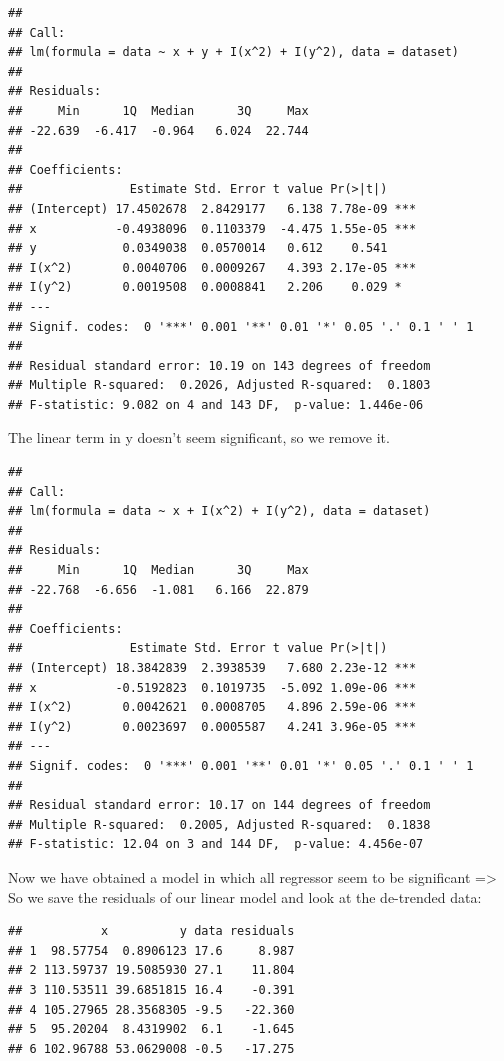 \documentclass[
]{article}
\begin{document}
\begin{verbatim}
## 
## Call:
## lm(formula = data ~ x + y + I(x^2) + I(y^2), data = dataset)
## 
## Residuals:
##     Min      1Q  Median      3Q     Max 
## -22.639  -6.417  -0.964   6.024  22.744 
## 
## Coefficients:
##               Estimate Std. Error t value Pr(>|t|)    
## (Intercept) 17.4502678  2.8429177   6.138 7.78e-09 ***
## x           -0.4938096  0.1103379  -4.475 1.55e-05 ***
## y            0.0349038  0.0570014   0.612    0.541    
## I(x^2)       0.0040706  0.0009267   4.393 2.17e-05 ***
## I(y^2)       0.0019508  0.0008841   2.206    0.029 *  
## ---
## Signif. codes:  0 '***' 0.001 '**' 0.01 '*' 0.05 '.' 0.1 ' ' 1
## 
## Residual standard error: 10.19 on 143 degrees of freedom
## Multiple R-squared:  0.2026, Adjusted R-squared:  0.1803 
## F-statistic: 9.082 on 4 and 143 DF,  p-value: 1.446e-06
\end{verbatim}

The linear term in y doesn't seem significant, so we remove it.

\begin{verbatim}
## 
## Call:
## lm(formula = data ~ x + I(x^2) + I(y^2), data = dataset)
## 
## Residuals:
##     Min      1Q  Median      3Q     Max 
## -22.768  -6.656  -1.081   6.166  22.879 
## 
## Coefficients:
##               Estimate Std. Error t value Pr(>|t|)    
## (Intercept) 18.3842839  2.3938539   7.680 2.23e-12 ***
## x           -0.5192823  0.1019735  -5.092 1.09e-06 ***
## I(x^2)       0.0042621  0.0008705   4.896 2.59e-06 ***
## I(y^2)       0.0023697  0.0005587   4.241 3.96e-05 ***
## ---
## Signif. codes:  0 '***' 0.001 '**' 0.01 '*' 0.05 '.' 0.1 ' ' 1
## 
## Residual standard error: 10.17 on 144 degrees of freedom
## Multiple R-squared:  0.2005, Adjusted R-squared:  0.1838 
## F-statistic: 12.04 on 3 and 144 DF,  p-value: 4.456e-07
\end{verbatim}

Now we have obtained a model in which all regressor seem to be
significant =\textgreater{} So we save the residuals of our linear model
and look at the de-trended data:

\begin{verbatim}
##           x          y data residuals
## 1  98.57754  0.8906123 17.6     8.987
## 2 113.59737 19.5085930 27.1    11.804
## 3 110.53511 39.6851815 16.4    -0.391
## 4 105.27965 28.3568305 -9.5   -22.360
## 5  95.20204  8.4319902  6.1    -1.645
## 6 102.96788 53.0629008 -0.5   -17.275
\end{verbatim}
\end{document}
